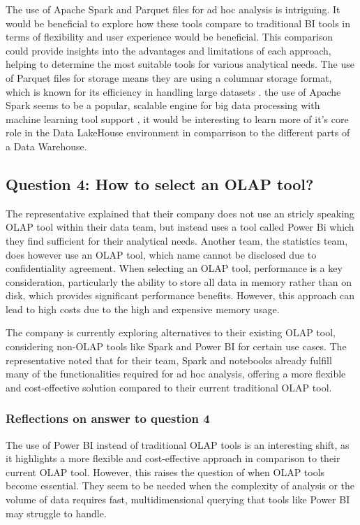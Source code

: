 The use of Apache Spark and Parquet files for ad hoc analysis is intriguing. It would be beneficial to explore how these tools compare to
traditional BI tools in terms of flexibility and user experience would be beneficial. This comparison could provide insights into the advantages and limitations of each approach, helping to determine the most suitable tools for various analytical needs.
The use of Parquet files for storage means they are using a columnar storage format, which is known for its efficiency in handling large datasets \cite{apache_parquet}.
the use of Apache Spark seems to be a popular, scalable engine for big data processing with machine learning tool support \cite{apache_spark}, it would be interesting to learn more of it's core role in the Data LakeHouse environment in comparrison to the different parts of a Data Warehouse.

\subsection{Question 4: How to select an OLAP tool?}

The representative explained that their company does not use an stricly speaking OLAP tool within their data team, but instead uses a tool called Power Bi which they find sufficient for their analytical needs. 
Another team, the statistics team, does however use an OLAP tool, which name cannot be disclosed due to confidentiality agreement. 
When selecting an OLAP tool, performance is a key consideration, particularly the ability to store all data in memory rather than on disk, which 
provides significant performance benefits. However, this approach can lead to high costs due to the high and expensive memory usage.

The company is currently exploring alternatives to their existing OLAP tool, considering non-OLAP tools like Spark and Power BI for certain use cases. 
The representative noted that for their team, Spark and notebooks already fulfill many of the functionalities required for ad hoc analysis, 
offering a more flexible and cost-effective solution compared to their current traditional OLAP tool.

\subsubsection{Reflections on answer to question 4}

The use of Power BI instead of traditional OLAP tools is an interesting shift, as it highlights a more flexible and cost-effective approach
in comparison to their current OLAP tool. 
However, this raises the question of when OLAP tools become essential. They seem to be needed when the complexity of analysis or the volume 
of data requires fast, multidimensional querying \cite[p.1288]{CourseLitt} that tools like Power BI may struggle to handle.

